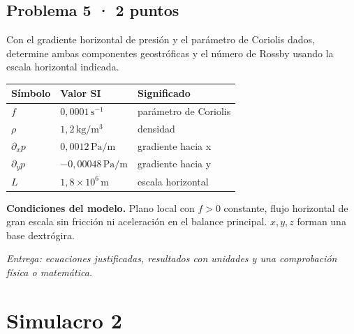 \par\medskip\noindent\begin{minipage}{\linewidth}

\section{Problema 5 · 2 puntos}

Con el gradiente horizontal de presión y el parámetro de Coriolis dados, determine ambas componentes geostróficas y el número de Rossby usando la escala horizontal indicada.

\begin{tabular}{@{}p{.15\linewidth}p{.23\linewidth}p{.54\linewidth}@{}}
\toprule Símbolo & Valor SI & Significado\\\midrule
$f$ & $0{,}0001\,\mathrm{s^{-1}}$ & parámetro de Coriolis\\
$\rho$ & $1{,}2\,\mathrm{kg/m^3}$ & densidad\\
$\partial_xp$ & $0{,}0012\,\mathrm{Pa/m}$ & gradiente hacia x\\
$\partial_yp$ & $-0{,}00048\,\mathrm{Pa/m}$ & gradiente hacia y\\
$L$ & $1{,}8\times10^{6}\,\mathrm{m}$ & escala horizontal\\
\bottomrule\end{tabular}

\par\medskip\textbf{Condiciones del modelo.} Plano local con $f>0$ constante, flujo horizontal de gran escala sin fricción ni aceleración en el balance principal. $x,y,z$ forman una base dextrógira.

\par\textit{Entrega: ecuaciones justificadas, resultados con unidades y una comprobación física o matemática.}

\end{minipage}\par\medskip


\chapter{Simulacro 2}


